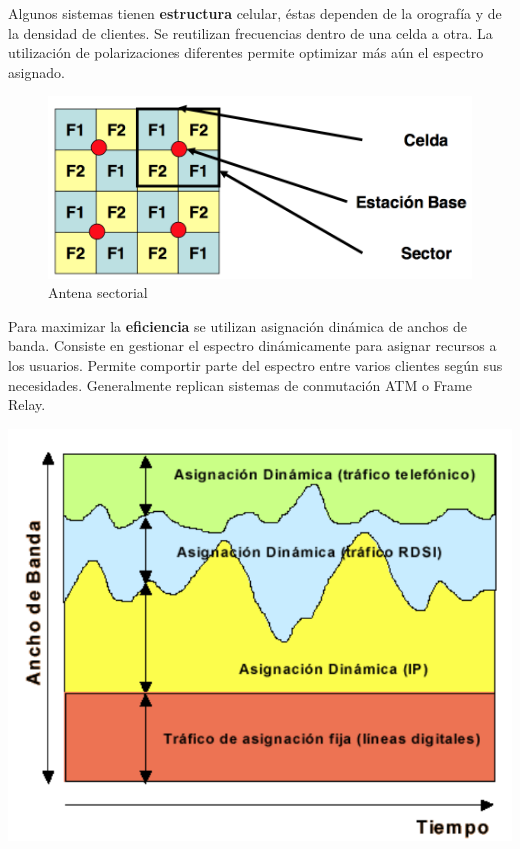 \documentclass[10pt,portrait, twocolumn]{article}
\makeatletter
\renewcommand{\subsubsection}{\@startsection{subsubsection}{3}{0mm}%
                                {-1ex plus -.5ex minus -.2ex}%
                                {1ex plus .2ex}%
                                {\normalfont\small\bfseries}}
\makeatother
\begin{document}
Algunos sistemas tienen \textbf{estructura} celular, éstas dependen de la orografía y de la densidad de clientes. Se reutilizan frecuencias dentro de una celda a otra. La utilización de polarizaciones diferentes permite optimizar más aún el espectro asignado.


	\begin{figure}[!ht]
 		\centering
  		 \includegraphics[scale = 0.4]{images/Espectro}
		\caption{Antena sectorial}
	\end{figure}	


Para maximizar la \textbf{eficiencia} se utilizan asignación dinámica de anchos de banda. Consiste en gestionar el espectro dinámicamente para asignar recursos a los usuarios. Permite comportir parte del espectro entre varios clientes según sus necesidades. Generalmente replican sistemas de conmutación ATM o Frame Relay.

	\begin{center}
		\includegraphics[scale=0.3]{images/Eficiencia}
	\end{center}
	
\end{document}
